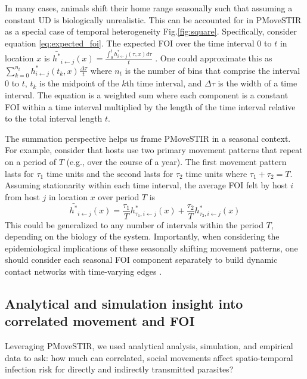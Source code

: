 \documentclass[letterpaper]{article}
\begin{document}
In many cases, animals shift their home range seasonally \citep{Viana2018,Richard2014} such that assuming a constant UD is biologically unrealistic. This can be accounted for in PMoveSTIR as a special case of temporal heterogeneity Fig.\ref{fig:square}.  Specifically, consider equation \ref{eq:expected_foi}. The expected FOI over the time interval 0 to $t$ in location $x$ is $\bar{h^*}_{i \leftarrow j}(x) = \frac{\int_0^t h^*_{i \leftarrow j}(\tau, x) d\tau}{t}$ \citep{Wilber2022}.  One could approximate this as $\sum_{k = 0}^{n_t} h^*_{i \leftarrow j}(t_k, x) \frac{\Delta \tau}{t}$ where $n_t$ is the number of bins that comprise the interval 0 to $t$, $t_k$ is the midpoint of the $k$th time interval, and $\Delta \tau$ is the width of a time interval.  The equation is a weighted sum where each component is a constant FOI within a time interval multiplied by the length of the time interval relative to the total interval length $t$.  

The summation perspective helps us frame PMoveSTIR in a seasonal context.  For example, consider that hosts use two primary movement patterns that repeat on a period of $T$ (e.g., over the course of a year).  The first movement pattern lasts for $\tau_1$ time units and the second lasts for $\tau_2$ time units where $\tau_1 + \tau_2 = T$.  Assuming stationarity within each time interval, the average FOI felt by host $i$ from host $j$ in location $x$ over period $T$ is 
\begin{equation}
\bar{h^*}_{i \leftarrow j}(x) = \frac{\tau_1}{T} h^*_{\tau_1, i \leftarrow j}(x) + \frac{\tau_2}{T} h^*_{\tau_2, i \leftarrow j}(x)
\label{eq:seasonal}
\end{equation}
This could be generalized to any number of intervals within the period $T$, depending on the biology of the system.  Importantly, when considering the epidemiological implications of these seasonally shifting movement patterns, one should consider each seasonal FOI component separately to build dynamic contact networks with time-varying edges \citep{Wilber2022}.


\subsection*{Analytical and simulation insight into correlated movement and FOI}

Leveraging PMoveSTIR, we used analytical analysis, simulation, and empirical data to ask: how much can correlated, social movements affect spatio-temporal infection risk for directly and indirectly transmitted parasites? 
\end{document}

